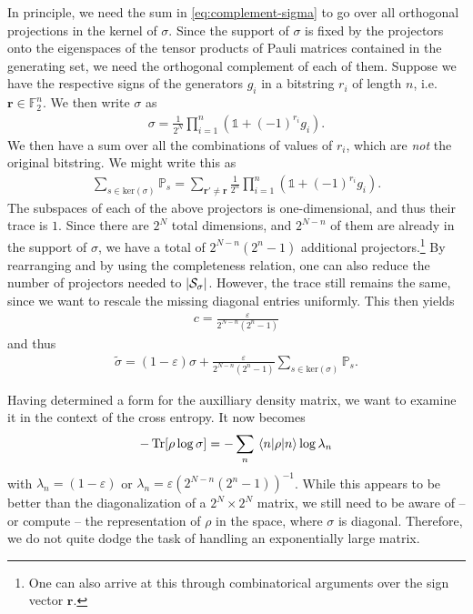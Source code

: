 In principle, we need the sum in \cref{eq:complement-sigma} to go over all
orthogonal projections in the kernel of $\sigma$.
Since the support of $\sigma$ is fixed by the projectors onto the eigenspaces
of the tensor products of Pauli matrices contained in the generating set, we
need the orthogonal complement of each of them. Suppose we have the respective
signs of the generators $g_i$ in a bitstring $r_i$ of length $n$, i.e.
$\mathbf{r} \in \mathbb{F}^n_2$. We then write $\sigma$ as
\begin{align}
  \sigma = \frac{1}{2^N} \prod_{i=1}^n \left( \mathds{1}+(-1)^{r_i} g_i \right) 
.\end{align}
We then have a sum over all the combinations of values of $r_i$, which are
\emph{not} the original bitstring. We might write this as
\begin{align}
  \sum_{s\in\mathrm{ker}(\sigma)} \mathbb{P}_s = \sum_{\mathbf{r}' \neq \mathbf{r}} \frac{1}{2^n}\prod_{i=1}^n \left(
  \mathds{1} + (-1)^{r_i} g_i \right) 
.\end{align}
The subspaces of each of the above projectors is one-dimensional, and thus
their trace is $1$. Since there are $2^N$ total dimensions, and $2^{N-n}$ of
them are already in the support of $\sigma$, we have a total of $2^{N-n}\left(
2^n -1\right)$ additional projectors.\footnote{One can also arrive at this through
combinatorical arguments over the sign vector $\mathbf{r}$.} By rearranging and
by using the completeness relation, one can also reduce the number of
projectors needed to $\abs{\mathcal{S}_\sigma}$. However, the trace still
remains the same, since we want to rescale the missing diagonal entries
uniformly. This then yields
\begin{align}
  c = \frac{\varepsilon}{2^{N-n}\left( 2^n -1 \right) }
\end{align}
and thus
\begin{align}
  \tilde{\sigma} = (1-\varepsilon)\sigma + \frac{\varepsilon}{2^{N-n}\left( 2^n
  -1 \right) } \sum_{s\in\mathrm{ker}(\sigma)} \mathbb{P}_s
.\end{align}

Having determined a form for the auxilliary density matrix, we want to examine
it in the context of the cross entropy. It now becomes
\begin{align}
  -\Tr[\rho\log\sigma] = -\sum_n \matrixel{n}{\rho}{n} \log\lambda_n
\end{align}
with $\lambda_n =(1-\varepsilon)$ or $\lambda_n = \varepsilon
\left(2^{N-n}(2^n-1) \right)^{-1}$. While this appears to be better than the
diagonalization of a $2^{N} \times 2^{N}$ matrix, we still need to be aware
of -- or compute -- the representation of $\rho$ in the space, where $\sigma$
is diagonal.  Therefore, we do not quite dodge the task of handling an
exponentially large matrix.

